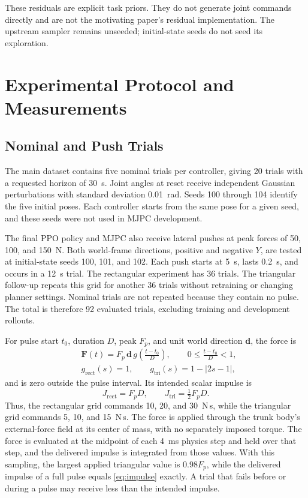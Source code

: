\documentclass[conference]{IEEEtran}
\begin{document}
These residuals are explicit task priors. They do not generate joint commands directly and are not the motivating paper's residual implementation. The upstream sampler remains unseeded; initial-state seeds do not seed its exploration.

\section{Experimental Protocol and Measurements}

\subsection{Nominal and Push Trials}

The main dataset contains five nominal trials per controller, giving 20 trials with a requested horizon of 30~s. Joint angles at reset receive independent Gaussian perturbations with standard deviation 0.01~rad. Seeds 100 through 104 identify the five initial poses. Each controller starts from the same pose for a given seed, and these seeds were not used in MJPC development.

The final PPO policy and MJPC also receive lateral pushes at peak forces of 50, 100, and 150~N. Both world-frame directions, positive and negative $Y$, are tested at initial-state seeds 100, 101, and 102. Each push starts at 5~s, lasts 0.2~s, and occurs in a 12~s trial. The rectangular experiment has 36 trials. The triangular follow-up repeats this grid for another 36 trials without retraining or changing planner settings. Nominal trials are not repeated because they contain no pulse. The total is therefore 92 evaluated trials, excluding training and development rollouts.

For pulse start $t_0$, duration $D$, peak $F_p$, and unit world direction $\mathbf d$, the force is
\begin{equation}
\begin{aligned}
&\mathbf F(t)=F_p\,\mathbf d\,g\!\left(\frac{t-t_0}{D}\right),\qquad 0\leq \frac{t-t_0}{D}<1,\\
&g_{\mathrm{rect}}(s)=1,\qquad g_{\mathrm{tri}}(s)=1-|2s-1|,
\end{aligned}
\label{eq:pulse}
\end{equation}
and is zero outside the pulse interval. Its intended scalar impulse is
\begin{equation}
J_{\mathrm{rect}}=F_pD,\qquad J_{\mathrm{tri}}=\tfrac{1}{2}F_pD.
\label{eq:impulse}
\end{equation}
Thus, the rectangular grid commands 10, 20, and 30~N\,s, while the triangular grid commands 5, 10, and 15~N\,s. The force is applied through the trunk body's external-force field at its center of mass, with no separately imposed torque. The force is evaluated at the midpoint of each 4~ms physics step and held over that step, and the delivered impulse is integrated from those values. With this sampling, the largest applied triangular value is $0.98F_p$, while the delivered impulse of a full pulse equals \eqref{eq:impulse} exactly. A trial that fails before or during a pulse may receive less than the intended impulse.
\end{document}
